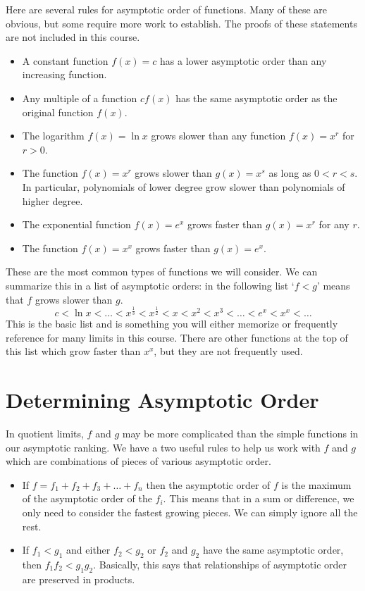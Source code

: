 \documentclass[fleqn]{report}
\begin{document}
Here are several rules for asymptotic order of functions. Many
of these are obvious, but some require more work to establish.
The proofs of these statements are not included in this
course.
\begin{itemize}
\item A constant function $f(x) = c$ has a lower asymptotic
order than any increasing function.
\item Any multiple of a function $c f(x)$ has the same
asymptotic order as the original function $f(x)$. 
\item The logarithm $f(x) = \ln x$ grows slower than any
function $f(x) = x^r$ for $r > 0$. 
\item The function $f(x) = x^r$ grows slower than $g(x) = x^s$
as long as $0 < r< s$. In particular, polynomials of lower
degree grow slower than polynomials of higher degree.
\item The exponential function $f(x) = e^x$ grows faster than
$g(x) = x^r$ for any $r$.
\item The function $f(x) = x^x$ grows faster than $g(x) = e^x$.
\end{itemize}
These are the most common types of functions we will consider.
We can summarize this in a list of asymptotic orders: in the
following list `$f<g$' means that $f$ grows slower
than $g$. 
\begin{equation*}
c < \ln x < \ldots < x^{\frac{1}{3}} < x^{\frac{1}{2}} < x < x^2
< x^3 < \ldots < e^x < x^x < \ldots
\end{equation*}
This is the basic list and is something you will either
memorize or frequently reference for many limits in this course.
There are other functions at the top of this list which grow
faster than $x^x$, but they are not frequently used.

\section*{Determining Asymptotic Order}

In quotient limits, $f$ and $g$ may be more complicated than
the simple functions in our asymptotic ranking. We have a
two useful rules to help us work with $f$ and $g$ which are
combinations of pieces of various asymptotic order.
\begin{itemize}
\item If $f = f_1 + f_2 + f_3 + \ldots + f_n$ then the
asymptotic order of $f$ is the maximum of the asymptotic order
of the $f_i$. This means that in a sum or difference, we only
need to consider the fastest growing pieces. We can simply
ignore all the rest.
\item If $f_1 < g_1$ and either $f_2 < g_2$ or $f_2$ and $g_2$
have the same asymptotic order, then $f_1 f_2 < g_1 g_2$.
Basically, this says that relationships of asymptotic order are
preserved in products.
\end{itemize}
\end{document}
